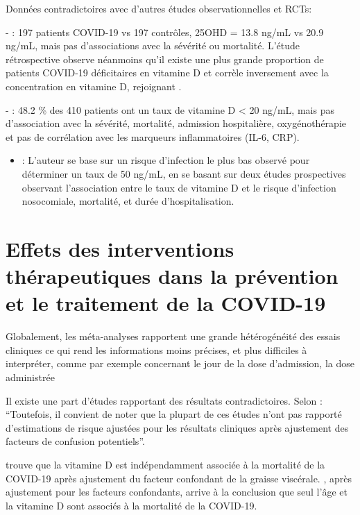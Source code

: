 \documentclass[
  a4paper,
  DIV=11,
  numbers=noendperiod,
  listof=totoc]{scrreprt}
\providecommand{\tightlist}{%
  \setlength{\itemsep}{0pt}\setlength{\parskip}{0pt}}\usepackage{longtable,booktabs,array}
\begin{document}
Données contradictoires avec d'autres études observationnelles et RCTs:

- \textcite{Hernández.2020} : 197 patients COVID-19 vs 197 contrôles,
25OHD = 13.8 ng/mL vs 20.9 ng/mL, mais pas d'associations avec la
sévérité ou mortalité. L'étude rétrospective observe néanmoins qu'il
existe une plus grande proportion de patients COVID-19 déficitaires en
vitamine D et corrèle inversement avec la concentration en vitamine D,
rejoignant \textcite{Campi.2021}.

- \textcite{Jevalikar.2021}: 48.2 \% des 410 patients ont un taux de
vitamine D \textless{} 20 ng/mL, mais pas d'association avec la
sévérité, mortalité, admission hospitalière, oxygénothérapie et pas de
corrélation avec les marqueurs inflammatoires (IL-6, CRP).

\begin{itemize}
\tightlist
\item
  \textcite{Wimalawansa.2022} : L'auteur se base sur un risque
  d'infection le plus bas observé pour déterminer un taux de 50 ng/mL,
  en se basant sur deux études prospectives observant l'association
  entre le taux de vitamine D et le risque d'infection nosocomiale,
  mortalité, et durée d'hospitalisation.
\end{itemize}

\section{Effets des interventions thérapeutiques dans la prévention et
le traitement de la
COVID-19}\label{effets-des-interventions-thuxe9rapeutiques-dans-la-pruxe9vention-et-le-traitement-de-la-covid-19}

Globalement, les méta-analyses rapportent une grande hétérogénéité des
essais cliniques ce qui rend les informations moins précises, et plus
difficiles à interpréter, comme par exemple concernant le jour de la
dose d'admission, la dose administrée

Il existe une part d'études rapportant des résultats contradictoires.
Selon \textcite{Pal.2022}: ``Toutefois, il convient de noter que la
plupart de ces études n'ont pas rapporté d'estimations de risque
ajustées pour les résultats cliniques après ajustement des facteurs de
confusion potentiels''.

\textcite{Vanegas-Cedillo.2022} trouve que la vitamine D est
indépendamment associée à la mortalité de la COVID-19 après ajustement
du facteur confondant de la graisse viscérale. \textcite{Borsche.2021},
après ajustement pour les facteurs confondants, arrive à la conclusion
que seul l'âge et la vitamine D sont associés à la mortalité de la
COVID-19.
\end{document}
